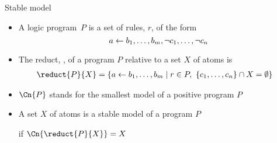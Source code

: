 \begin{frame}{Stable model}
  \begin{itemize}
  \item A \alert{logic program}~$P$ is a \alert{set of rules}, $r$, of the form
    \[\large
      {a}\leftarrow{b_1,\dots,b_m,\neg{c_1},\dots,\neg{c_n}}
    \]

  \item<2-> The \alert{reduct}, , of a program $P$ relative to a set $X$ of atoms is
    \begin{align*}
      \reduct{P}{X} &= \{a\leftarrow b_1,\dots,b_m \mid r\in P,\ \{c_1,\dots,c_n\}\cap X=\emptyset\}
    \end{align*}
  \item<2-> $\Cn{P}$ stands for the smallest model of a positive program $P$
    \bigskip
  \item<3-> A set $X$ of atoms is a \alert{stable model} of a program $P$

    if $\Cn{\reduct{P}{X}}=X$
  \end{itemize}
\end{frame}
%
